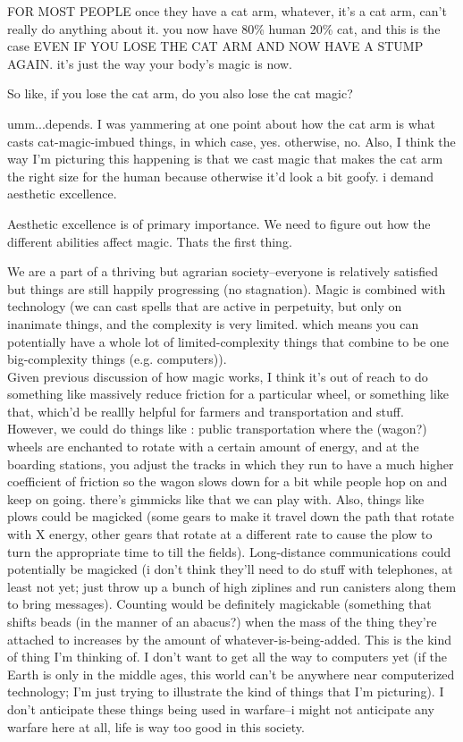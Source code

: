 FOR MOST PEOPLE once they have a cat arm, whatever, it's a cat arm, can't really
do anything about it. you now have 80\% human 20\% cat, and this is the case
   EVEN IF YOU LOSE THE CAT ARM AND NOW HAVE A STUMP AGAIN. it's just the way
   your body's magic is now.

\A So like, if you lose the cat arm, do you also lose the cat magic?

\R umm...depends.  I was yammering at one point about how the cat arm is what
casts cat-magic-imbued things, in which case, yes.  otherwise, no.  Also, I
think the way I'm picturing this happening is that we cast magic that makes the
cat arm the right size for the human because otherwise it'd look a bit goofy. i
demand aesthetic excellence.

\A Aesthetic excellence is of primary importance. We need to figure out how the
different abilities affect magic. Thats the first thing. 

\R We are a part of a thriving but agrarian society--everyone is relatively
satisfied but things are still happily progressing (no stagnation).  Magic is
combined with technology (we can cast spells that are active in perpetuity, but
only on inanimate things, and the complexity is very limited. which means you
can potentially have a whole lot of limited-complexity things that combine to be
one big-complexity things (e.g. computers)).  \\ Given previous discussion of
how magic works, I think it's out of reach to do something like massively reduce
friction for a particular wheel, or something like that, which'd be reallly
helpful for farmers and transportation and stuff.  However, we could do things
like : public transportation where the (wagon?) wheels are enchanted to rotate
with a certain amount of energy, and at the boarding stations, you adjust the
tracks in which they run to have a much higher coefficient of friction so the
wagon slows down for a bit while people hop on and keep on going. there's
gimmicks like that we can play with.  Also, things like plows could be magicked
(some gears to make it travel down the path that rotate with X energy, other
gears that rotate at a different rate to cause the plow to turn the appropriate
time to till the fields).  Long-distance communications could potentially be
magicked (i don't think they'll need to do stuff with telephones, at least not
yet; just throw up a bunch of high ziplines and run canisters along them to
bring messages).  Counting would be definitely magickable (something that shifts
beads (in the manner of an abacus?) when the mass of the thing they're attached
to increases by the amount of whatever-is-being-added. This is the kind of thing
I'm thinking of.  I don't want to get all the way to computers yet (if the Earth
is only in the middle ages, this world can't be anywhere near computerized
technology; I'm just trying to illustrate the kind of things that I'm
picturing).  I don't anticipate these things being used in warfare--i might not
anticipate any warfare here at all, life is way too good in this society. \\ 

